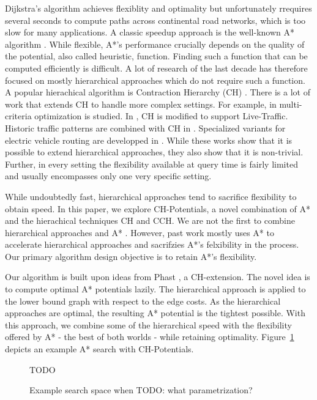 \documentclass[a4paper,UKenglish,cleveref, autoref]{lipics-v2019}
\begin{document}
Dijkstra's algorithm \cite{?} achieves flexiblity and optimality but unfortunately rrequires several seconds to compute paths across continental road networks, which is too slow for many applications.
A classic speedup approach is the well-known A* algorithm \cite{hnr-afbhd-68}.
While flexible, A*'s performance crucially depends on the quality of the potential, also called heuristic, function.
Finding such a function that can be computed efficiently is difficult.
A lot of research of the last decade has therefore focused on mostly hierarchical approaches \cite{CH,CCH,CRP,HIGHWAYHIERACHIES,MLD} which do not require such a function.
A popular hierachical algorithm is Contraction Hierarchy (CH) \cite{geisberger}.
There is a lot of work that extends CH to handle more complex settings.
For example, in \cite{sabine, kobitzsch} multi-criteria optimization is studied.
In \cite{CCH}, CH is modified to support Live-Traffic.
Historic traffic patterns are combined with CH in \cite{TD-CCH-preprint, TDCH, TDCRP}.
Specialized variants for electric vehicle routing are developped in \cite{moritz baum, charge}.
While these works show that it is possible to extend hierarchical approaches, they also show that it is non-trivial.
Further, in every setting the flexibility available at query time is fairly limited and usually encompasses only one very specific setting.

While undoubtedly fast, hierarchical approaches tend to sacrifice flexibility to obtain speed.
In this paper, we explore CH-Potentials, a novel combination of A* and the hierachical techniques CH and CCH.
We are not the first to combine hierarchical approaches and A* \cite{core-alt, real, charge, bdsssw-chgds-08}.
However, past work mostly uses A* to accelerate hierarchical approaches and sacrifzies A*'s felxibility in the process.
Our primary algorithm design objective is to retain A*'s flexibility.

Our algorithm is built upon ideas from Phast \cite{?}, a CH-extension.
The novel idea is to compute optimal A* potentials lazily.
The hierarchical approach is applied to the lower bound graph with respect to the edge costs.
As the hierarchical approaches are optimal, the resulting A* potential is the tightest possible.
With this approach, we combine some of the hierarchical speed with the flexibility offered by A* - the best of both worlds - while retaining optimality.
Figure~\ref{img:search-space} depicts an example  A* search with CH-Potentials.

\begin{figure}
TODO

\caption{Example search space when TODO: what parametrization?}
\label{img:search-space}
\end{figure}
\end{document}
